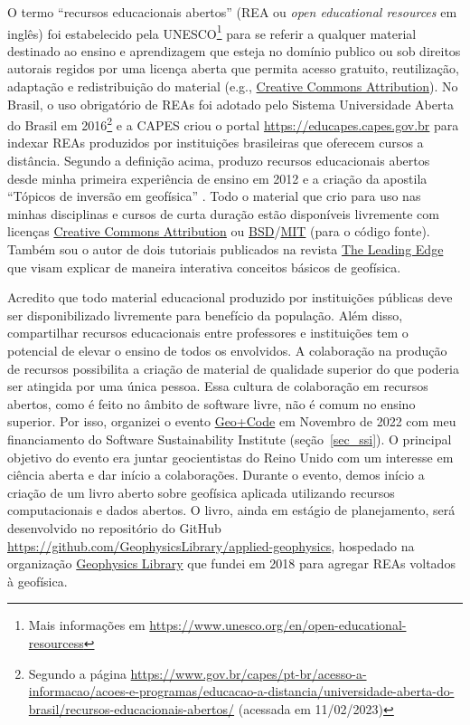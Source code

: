 \documentclass[12pt,a4paper,oneside]{book}
\begin{document}
O termo ``recursos educacionais abertos'' (REA ou \textit{open educational
resources} em inglês) foi estabelecido pela UNESCO\footnote{Mais informações em
\url{https://www.unesco.org/en/open-educational-resourcess}} para se referir a
qualquer material destinado ao ensino e aprendizagem que
esteja no domínio publico ou sob direitos autorais regidos por uma licença
aberta que permita acesso gratuito, reutilização, adaptação e redistribuição do
material
(e.g., \href{https://creativecommons.org/licenses/by/4.0/}{Creative Commons Attribution}).
No Brasil, o uso obrigatório de REAs foi adotado pelo Sistema Universidade
Aberta do Brasil em 2016\footnote{Segundo a página
\url{https://www.gov.br/capes/pt-br/acesso-a-informacao/acoes-e-programas/educacao-a-distancia/universidade-aberta-do-brasil/recursos-educacionais-abertos/}
(acessada em 11/02/2023)}
e a CAPES criou o portal \url{https://educapes.capes.gov.br} para indexar REAs
produzidos por instituições brasileiras que oferecem cursos a distância.
Segundo a definição acima, produzo recursos educacionais abertos desde minha
primeira experiência de ensino em 2012 e a criação da apostila
``Tópicos de inversão em geofísica'' \citep{OliveiraJr2012}.
Todo o material que crio para uso nas minhas disciplinas e cursos de curta
duração estão disponíveis livremente com licenças
\href{https://creativecommons.org/licenses/by/4.0/}{Creative Commons Attribution}
ou
\href{https://opensource.org/licenses/BSD-3-Clause}{BSD}/\href{https://opensource.org/licenses/MIT}{MIT}
(para o código fonte).
Também sou o autor de dois tutoriais publicados na revista
\href{https://library.seg.org/journal/leedff}{The Leading Edge} que visam
explicar de maneira interativa conceitos básicos de geofísica.

Acredito que todo material educacional produzido por instituições públicas deve
ser disponibilizado livremente para benefício da população.
Além disso, compartilhar recursos educacionais entre professores e instituições
tem o potencial de elevar o ensino de todos os envolvidos.
A colaboração na produção de recursos possibilita a criação de material de
qualidade superior do que poderia ser atingida por uma única pessoa.
Essa cultura de colaboração em recursos abertos, como é feito no âmbito
de software livre, não é comum no ensino superior.
Por isso, organizei o evento
\href{https://hackmd.io/@leouieda/uk-geo-code-meetup}{Geo+Code} em Novembro de
2022 com meu financiamento do Software Sustainability Institute
(seção~\ref{sec_ssi}).
O principal objetivo do evento era juntar geocientistas do Reino Unido com um
interesse em ciência aberta e dar início a colaborações.
Durante o evento, demos início a criação de um livro aberto sobre geofísica
aplicada utilizando recursos computacionais e dados abertos.
O livro, ainda em estágio de planejamento, será desenvolvido no repositório
do GitHub \url{https://github.com/GeophysicsLibrary/applied-geophysics},
hospedado na organização \href{https://github.com/GeophysicsLibrary}{Geophysics Library}
que fundei em 2018 para agregar REAs voltados à geofísica.
\end{document}
